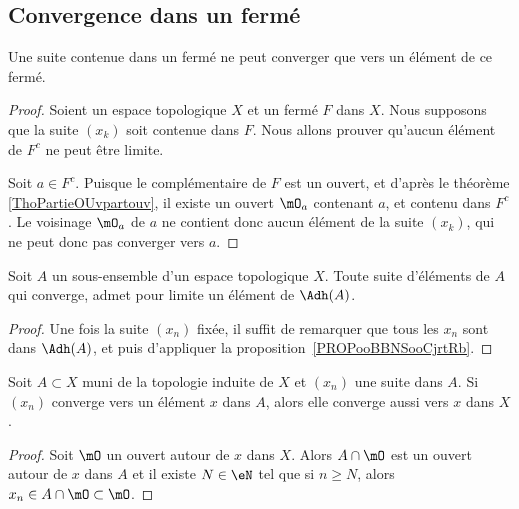 \subsection{Convergence dans un fermé}

\begin{proposition}      \label{PROPooBBNSooCjrtRb}
	Une suite contenue dans un fermé ne peut converger que vers un élément de ce fermé.
\end{proposition}

\begin{proof}
	Soient un espace topologique \( X\) et un fermé \( F\) dans \( X\). Nous supposons que la suite \( (x_k)\) soit contenue dans \( F\). Nous allons prouver qu'aucun élément de \( F^c\) ne peut être limite.

	Soit \( a \in F^c\). Puisque le complémentaire de \( F\) est un ouvert, et d'après le théorème \ref{ThoPartieOUvpartouv}, il existe un ouvert \( \mO_a\) contenant \( a\), et contenu dans \( F^c\). Le voisinage \( \mO_a\) de \( a\) ne contient donc aucun élément de la suite \( (x_k)\), qui ne peut donc pas converger vers \( a\).
\end{proof}

\begin{corollary}\label{CorLimAbarA}
	Soit \( A \) un sous-ensemble d'un espace topologique \( X\). Toute suite d'éléments de \( A\) qui converge, admet pour limite un élément de \( \Adh(A) \).
\end{corollary}
\begin{proof}
	Une fois la suite \( (x_n) \) fixée, il suffit de remarquer que tous les \( x_n \) sont dans \( \Adh(A) \), et puis d'appliquer la proposition~\ref{PROPooBBNSooCjrtRb}.
\end{proof}


\begin{lemma}   \label{LemPESaiVw}
	Soit \( A\subset X\) muni de la topologie induite de \( X\) et \( (x_n)\) une suite dans \( A\). Si \( (x_n) \) converge vers un élément \( x \) dans \(A \), alors elle converge aussi vers \(x \) dans \( X \).
\end{lemma}

\begin{proof}
	Soit \( \mO\) un ouvert autour de \( x\) dans \( X\). Alors \( A\cap\mO\) est un ouvert autour de \( x\) dans \( A\) et il existe \( N\in \eN\) tel que si \( n\geq N\), alors \( x_n\in A\cap\mO\subset\mO\).
\end{proof}

